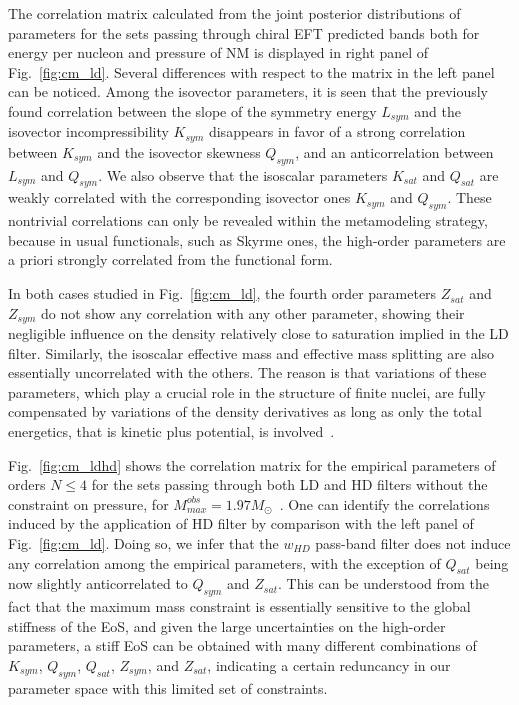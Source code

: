The correlation matrix calculated from the joint posterior distributions of
parameters for the sets passing through chiral EFT predicted bands both for 
energy per nucleon and pressure of NM is displayed in right panel of 
Fig.~\ref{fig:cm_ld}. Several differences with respect to the matrix in the 
left panel can be noticed.
Among the isovector parameters, it is seen that the previously found 
correlation between the slope of the symmetry energy $L_{sym}$ and the 
isovector incompressibility $K_{sym}$ disappears in favor of a strong 
correlation between $K_{sym}$ and the isovector skewness $Q_{sym}$, and an 
anticorrelation between $L_{sym}$ and $Q_{sym}$. We also observe that the 
isoscalar parameters $K_{sat}$ and $Q_{sat}$ are weakly correlated with the 
corresponding isovector ones $K_{sym}$ and $Q_{sym}$. These nontrivial 
correlations can only be revealed within the metamodeling strategy, because in 
usual functionals, such as Skyrme ones, the high-order parameters are a priori 
strongly correlated from the functional form. 

In both cases studied in Fig.~\ref{fig:cm_ld}, the fourth order parameters 
$Z_{sat}$ and $Z_{sym}$ do not show any correlation with any other parameter, 
showing their negligible influence on the density relatively close to 
saturation implied in the LD filter. Similarly, the isoscalar effective mass 
and effective mass splitting are also essentially uncorrelated 
with the others. The reason is that variations of these parameters, which play 
a crucial role in the structure of finite nuclei, are fully compensated by 
variations of the density derivatives as long as only the total energetics, 
that is kinetic plus potential, is involved~\cite{Chatterjee2017}.

Fig.~\ref{fig:cm_ldhd} shows the correlation matrix for the empirical 
parameters of orders $N \leq 4$ for the sets passing through both LD and HD 
filters without the constraint on pressure, for
$M_{max}^{obs}=1.97M_\odot$~\cite{Antoniadis2013}. One can identify the 
correlations induced by the application of HD filter by comparison with the 
left panel of Fig.~\ref{fig:cm_ld}. Doing so, we infer that the $w_{HD}$ 
pass-band filter does not induce any correlation among the 
empirical parameters, with the exception of $Q_{sat}$ being now slightly 
anticorrelated to $Q_{sym}$ and $Z_{sat}$. 
%
This can be understood from the fact that the maximum mass constraint is
essentially sensitive to the global stiffness of the EoS, and given the large 
uncertainties on the high-order parameters, a stiff EoS can be obtained with
many different combinations of $K_{sym}$, $Q_{sym}$, $Q_{sat}$, $Z_{sym}$, and
$Z_{sat}$, indicating a certain reduncancy in our parameter space with this
limited set of constraints.

